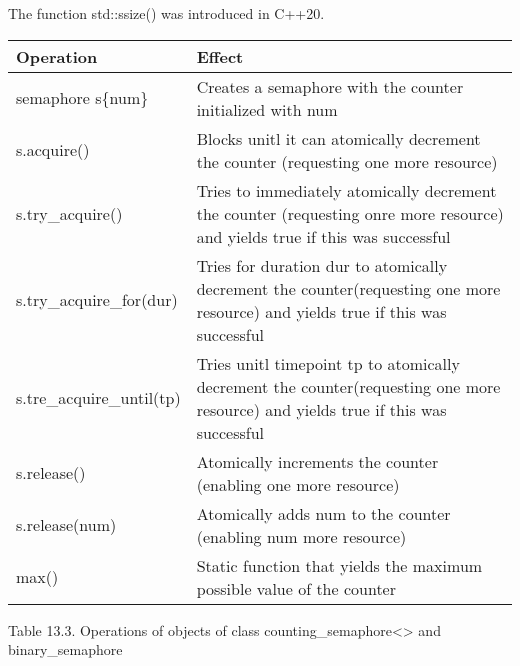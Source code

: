 The function std::ssize() was introduced in C++20.

\begin{longtable}[c]{|l|l|}
\hline
\textbf{Operation} & \textbf{Effect}                                                                     \\ \hline
\endfirsthead
%
\endhead
%
semaphore s\{num\} & Creates a semaphore with the counter initialized with num                           \\ \hline
s.acquire()        & Blocks unitl it can atomically decrement the counter (requesting one more resource) \\ \hline
s.try\_acquire()          & Tries to immediately atomically decrement the counter (requesting onre more resource) and yields true if this was successful      \\ \hline
s.try\_acquire\_for(dur)  & Tries for duration dur to atomically decrement the counter(requesting one more resource) and yields true if this was successful   \\ \hline
s.tre\_acquire\_until(tp) & Tries unitl timepoint tp to atomically decrement the counter(requesting one more resource) and yields true if this was successful \\ \hline
s.release()        & Atomically increments the counter (enabling one more resource)                      \\ \hline
s.release(num)     & Atomically adds num to the counter (enabling num more resource)                     \\ \hline
max()              & Static function that yields the maximum possible value of the counter               \\ \hline
\end{longtable}

\begin{center}
Table 13.3. Operations of objects of class counting\_semaphore<> and binary\_semaphore
\end{center}








